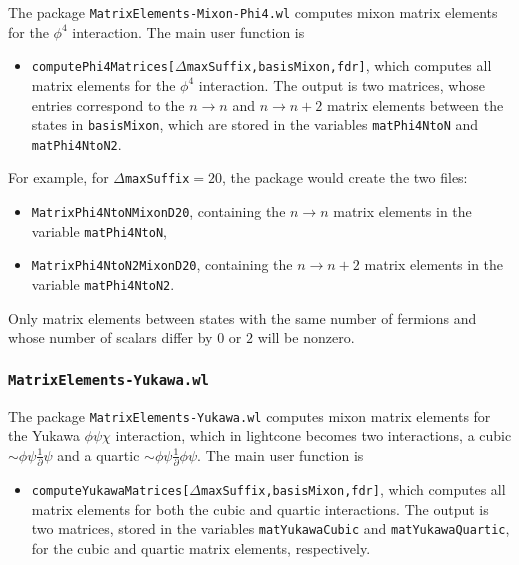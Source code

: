 \documentclass[12pt]{article}
\newcommand\De\Delta
\newcommand{\ra}{\rightarrow}
\begin{document}
The package {\tt MatrixElements-Mixon-Phi4.wl} computes mixon matrix elements for the $\phi^4$ interaction. The main user function is
\begin{itemize}
\item {\tt computePhi4Matrices[$\De$maxSuffix,basisMixon,fdr]}, which computes all matrix elements for  the $\phi^4$ interaction. The output is two matrices, whose entries correspond to the $n \ra n$ and $n \ra n+2$ matrix elements between the states in {\tt basisMixon}, which are stored in the variables {\tt matPhi4NtoN} and {\tt matPhi4NtoN2}.
\end{itemize}
For example, for {\tt $\De$maxSuffix$=20$}, the package would create the two files:
\begin{itemize}
\item {\tt MatrixPhi4NtoNMixonD20}, containing the $n \ra n$ matrix elements in the variable {\tt matPhi4NtoN},
\item {\tt MatrixPhi4NtoN2MixonD20}, containing the $n \ra n+2$ matrix elements in the variable {\tt matPhi4NtoN2}.
\end{itemize}
Only matrix elements between states with the same number of fermions and whose number of scalars differ by $0$ or $2$ will be nonzero.

\subsubsection*{{\tt MatrixElements-Yukawa.wl}}

The package {\tt MatrixElements-Yukawa.wl} computes mixon matrix elements for the Yukawa $\phi \psi \chi$ interaction, which in lightcone becomes two interactions, a cubic $\sim \phi \psi \frac{1}{\partial} \psi$ and a quartic $\sim \phi \psi \frac{1}{\partial} \phi \psi$. The main user function is
\begin{itemize}
\item {\tt computeYukawaMatrices[$\De$maxSuffix,basisMixon,fdr]}, which computes all matrix elements for both the cubic and quartic interactions. The output is two matrices,  stored in the variables {\tt matYukawaCubic} and {\tt matYukawaQuartic}, for the cubic and quartic matrix elements, respectively.
\end{itemize}
\end{document}
